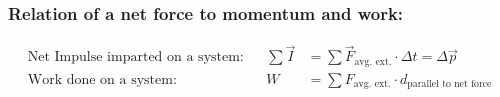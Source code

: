 \subsubsection*{Relation of a net force to momentum and work:}

\begin{align*}
	\text{Net Impulse imparted on a system:}			&& \sum\vec{I} &= \sum\vec{F}_\text{avg. ext.} \cdot \Delta t = \Delta \vec{p}\\[5mm] 
	\text{Work done on a system:}	&& W &= \sum F_\text{avg. ext.} \cdot d_\text{parallel to net force}
\end{align*}

\null